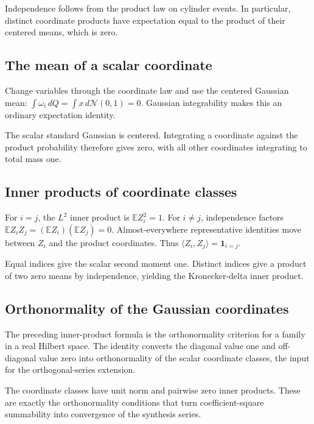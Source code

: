 \documentclass[11pt,a4paper]{article}
\begin{document}
Independence follows from the product law on cylinder events. In particular, distinct coordinate products have expectation equal to the product of their centered means, which is zero.


\subsection{\texorpdfstring{The mean of a scalar coordinate}{The mean of a scalar coordinate}}


Change variables through the coordinate law and use the centered Gaussian mean: \(\int\omega_i\,dQ=\int x\,d\mathcal N(0,1)=0\). Gaussian integrability makes this an ordinary expectation identity.



The scalar standard Gaussian is centered. Integrating a coordinate against the product probability therefore gives zero, with all other coordinates integrating to total mass one.


\subsection{\texorpdfstring{Inner products of coordinate classes}{Inner products of coordinate classes}}


For \(i=j\), the \(L^2\) inner product is \(\mathbb EZ_i^2=1\). For \(i\ne j\), independence factors \(\mathbb EZ_iZ_j=(\mathbb EZ_i)(\mathbb EZ_j)=0\). Almost-everywhere representative identities move between \(Z_i\) and the product coordinates. Thus \(\langle Z_i,Z_j\rangle=\mathbf1_{i=j}\).



Equal indices give the scalar second moment one. Distinct indices give a product of two zero means by independence, yielding the Kronecker-delta inner product.


\subsection{\texorpdfstring{Orthonormality of the Gaussian coordinates}{Orthonormality of the Gaussian coordinates}}


The preceding inner-product formula is the orthonormality criterion for a family in a real Hilbert space. The identity converts the diagonal value one and off-diagonal value zero into orthonormality of the scalar coordinate classes, the input for the orthogonal-series extension.



The coordinate classes have unit norm and pairwise zero inner products. These are exactly the orthonormality conditions that turn coefficient-square summability into convergence of the synthesis series.
\end{document}
